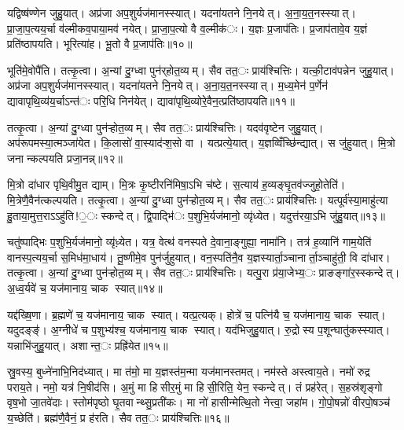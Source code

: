 
यद्विष्ष॑ण्णेन जुहु॒यात्। अप्र॑जा अप॒शुर्यज॑मानस्स्यात्। यदना॑यतने नि॒नयेत्। अ॒ना॒य॒त॒नस्स्यात्। प्रा॒जा॒प॒त्यय॒र्चा व॑ल्मीकव॒पाया॒मव॑ नयेत्। प्रा॒जा॒प॒त्यो वै व॒ल्मीक॑ः। य॒ज्ञः प्र॒जाप॑तिः। प्र॒जाप॑तावे॒व य॒ज्ञं प्रति॑ष्ठापयति। भूरित्या॑ह। भू॒तो वै प्र॒जाप॑तिः॥१०॥

भूति॑मे॒वोपै॑ति। तत्कृ॒त्वा। अ॒न्यां दु॒ग्ध्वा पुन॑र्‌होत॒व्यम्। सैव तत॒ः प्राय॑श्चित्तिः। यत्की॒टाव॑पन्नेन जुहु॒यात्। अप्र॑जा अप॒शुर्यज॑मानस्स्यात्। यदना॑यतने नि॒नयेत्। अ॒ना॒य॒त॒नस्स्यात्। म॒ध्य॒मेन॑ प॒र्णेन॑ द्यावापृथि॒व्य॑य॒र्चाऽन्त॑ः परि॒धि निन॑येत्। द्यावा॑पृथि॒व्योरे॒वैन॒त्प्रति॑ष्ठापयति॥११॥

तत्कृ॒त्वा। अ॒न्यां दु॒ग्ध्वा पुन॑ऱ्होत॒व्यम्। सैव तत॒ः प्राय॑श्चित्तिः। यदव॑वृष्टेन जुहु॒यात्। अप॑रूपमस्या॒त्मञ्जा॑येत। कि॒लासो॑ वा॒स्याद॑ऱ्श॒सो वा। यत्प्रत्ये॒यात्। य॒ज्ञव्विँच्छि॑न्द्यात्। स जु॑हुयात्। मि॒त्रो जनान्कल्पयति प्रजा॒नन्न्॥१२॥

मि॒त्रो दा॑धार पृथि॒वीमु॒त द्याम्। मि॒त्रः कृ॒ष्टीरनि॑मिषा॒ऽभि च॑ष्टे। स॒त्याय॑ ह॒व्यङ्घृ॒तव॑ज्जुहो॒तेति॑। मि॒त्रेणै॒वैन॑त्कल्पयति। तत्कृ॒त्वा। अ॒न्यां दु॒ग्ध्वा पुन॑ऱ्होत॒व्यम्। सैव तत॒ः प्राय॑श्चित्तिः। यत्पूर्व॑स्या॒माहु॑त्या हु॒ताया॒मुत्त॒राऽऽहु॑ति!॒ः स्कन्देत्। द्वि॒पाद्भि॑ः प॒शुभि॒र्यज॑मानो॒ व्यृ॑ध्येत। यदुत्त॑रया॒ऽभि जु॑हु॒यात्॥१३॥

चतु॑ष्पाद्भिः प॒शुभि॒र्यज॑मानो॒ व्यृ॑ध़्येत। यत्र॒ वेत्थ॑ वनस्पते दे॒वाना॒ङ्गुह्या॒ नामा॑नि। तत्र॑ ह॒व्यानि॑ गाम॒येति॑ वानस्प॒त्यय॒र्चा स॒मिध॑मा॒धाय॑। तू॒ष्णीमे॒व पुन॑र्जुहुयात्। वन॒स्पति॑नै॒व य॒ज्ञस्यार्ता॒ञ्चानार्ता॒ञ्चाहु॑ती॒ वि दा॑धार। तत्कृ॒त्वा। अ॒न्यां दु॒ग्ध्वा पुन॑ऱ्होत॒व्यम्। सैव तत॒ः प्राय॑श्चित्तिः। यत्पु॒रा प्र॑या॒जेभ्य॒ः प्राङङ्गा॑र॒स्स्कन्देत्। अ॒ध्व॒र्यवे॑ च॒ यज॑मानाय॒ चाक स्यात्॥१४॥

यद्द॑ख्षि॒णा। ब्र॒ह्मणे॑ च॒ यज॑मानाय॒ चाक स्यात्। यत्प्र॒त्यक्। होत्रे॑ च॒ पत्नि॑यै च॒ यज॑मानाय॒ चाक स्यात्। यदुदङ्ङ्॑। अ॒ग्नीधे॑ च प॒शुभ्य॑श्च॒ यज॑मानाय॒ चाक स्यात्। यद॑भिजुहु॒यात्। रु॒द्रोस्य प॒शून्घातु॑कस्स्यात्। यन्नाभि॑जुहु॒यात्। अशान्त॒ः प्रह्रि॑येत॥१५॥

स्रु॒वस्य॒ बुध्ने॑नाभि॒निद॑ध्यात्। मा त॑मो॒ मा य॒ज्ञस्त॑म॒न्मा यज॑मानस्तमत्। नम॑स्ते अस्त्वाय॒ते। नमो॑ रुद्र पराय॒ते। नमो॒ यत्र॑ नि॒षीद॑सि। अ॒मुं मा हिसीर॒मुं मा हिसी॒रिति॒ येन॒ स्कन्देत्। तं प्रह॑रेत्। स॒हस्र॑शृङ्गो वृष॒भो जा॒तवे॑दाः। स्तोम॑पृष्ठो घृ॒तवान्थ्सु॒प्रती॑कः। मा नो॑ हासीन्मेत्थि॒तो नेत्त्वा॒ जहा॑म। गो॒पो॒षन्नो॑ वीरपो॒षञ्च॑ य॒च्छेति॑। ब्रह्म॑णै॒वैनं॒ प्र ह॑रति। सैव तत॒ः प्राय॑श्चित्तिः॥१६॥

